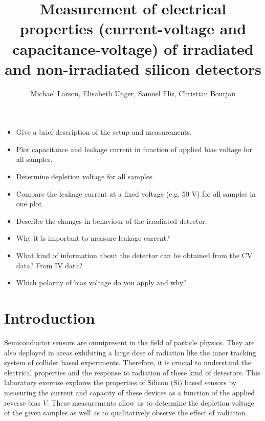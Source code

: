 \documentclass[11pt]{article}
\title{Measurement of electrical properties (current-voltage and capacitance-voltage) of irradiated and non-irradiated silicon detectors}
\author{Michael Larson, Elisabeth Unger, Samuel Flis, Christian Bourjau}
\begin{document}
\maketitle
\begin{itemize}
\item Give a brief description of the setup and measurements.
\item Plot capacitance and leakage current in function of applied bias voltage for all samples.
\item Determine depletion voltage for all samples.
\item Compare the leakage current at a fixed voltage (e.g. 50 V) for all samples in one plot.
\item Describe the changes in behaviour of the irradiated detector.
\item Why it is important to measure leakage current?
\item What kind of information about the detector can be obtained from the CV data? From IV data?
\item Which polarity of bias voltage do you apply and why?
\end{itemize}

\section{Introduction}
\label{sec:introduction}

Semiconductor sensors are omnipresent in the field of particle physics.
They are also deployed in areas exhibiting a large dose of radiation like the inner tracking system of collider based experiments.
Therefore, it is crucial to understand the electrical properties and the response to radiation of these kind of detectors.
This laboratory exercise explores the  properties of Silicon (Si) based sensors by measuring the current and capacity of these devices as a function of the applied reverse bias $V$.
These measurements allow us to determine the depletion voltage of the given samples as well as to qualitatively observe the effect of radiation.
\end{document}
